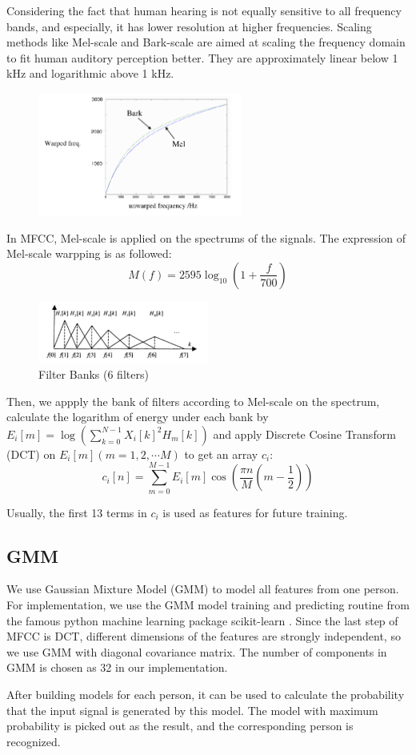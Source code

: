 Considering the fact that human hearing is not equally sensitive to all frequency bands, and especially, it has lower resolution at higher frequencies.
Scaling methods like Mel-scale and Bark-scale are aimed at scaling the frequency domain to fit human auditory perception better.
They are approximately linear below 1 kHz and logarithmic above 1 kHz.
\begin{figure}[H]
  \centering
  \includegraphics[width=0.6\textwidth]{res/mel-scale.png}
\end{figure}

In MFCC, Mel-scale is applied on the spectrums of the signals. The expression of Mel-scale warpping is as followed:
\[ M(f) = 2595 \log_{10}(1 + \dfrac{f}{700}) \]

\begin{figure}[H]
  \centering
  \includegraphics[width=0.5\textwidth]{res/bank.png}
  \caption{Filter Banks (6 filters) \label{fig:bank}}
\end{figure}
Then,  we appply the bank of filters according to Mel-scale on the spectrum,
calculate the logarithm of energy under each bank by $E_i[m] = \log (\sum_{k=0}^{N-1}{X_i[k]^2 H_m[k]}) $ and apply Discrete
Cosine Transform (DCT) on $E_i[m](m = 1, 2, \cdots M) $ to get an array $c_i $:
\[ c_i[n] = \sum_{m=0}^{M-1}{E_i[m]\cos(\dfrac{\pi n}{M}(m - \dfrac{1}{2}))} \]

Usually, the first 13 terms in $c_i $ is used as features for future training.

\subsection{GMM}

We use Gaussian Mixture Model (GMM) to model all features from one person.
For implementation, we use the GMM model training and predicting routine from the famous python
machine learning package scikit-learn \cite{sklearn}.
Since the last step of MFCC is DCT, different dimensions of the features are strongly independent, so we
use GMM with diagonal covariance matrix. The number of components in GMM is chosen as 32 in our implementation.

After building models for each person, it can be used to calculate the probability that the input signal is generated by this model.
The model with maximum probability is picked out as the result, and the corresponding person is recognized.

